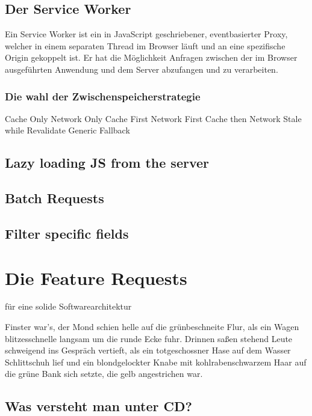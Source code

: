 \section{Der Service Worker}
Ein Service Worker ist ein in JavaScript geschriebener,
eventbasierter Proxy, welcher in einem separaten Thread im Browser
läuft und an eine spezifische Origin gekoppelt ist. Er hat
die Möglichkeit Anfragen zwischen der im Browser ausgeführten
Anwendung und dem Server abzufangen und zu verarbeiten.

\subsection{Die wahl der Zwischenspeicherstrategie}
Cache Only
Network Only
Cache First
Network First
Cache then Network
Stale while Revalidate
Generic Fallback

\section{Lazy loading JS from the server}

\section{Batch Requests}

\section{Filter specific fields}

\chapter{Die Feature Requests}

für eine solide Softwarearchitektur

Finster war's, der Mond schien helle auf die grünbeschneite Flur, als
ein Wagen blitzesschnelle langsam um die runde Ecke fuhr. Drinnen
saßen stehend Leute schweigend ins Gespräch vertieft, als ein
totgeschossner Hase auf dem Wasser Schlittschuh lief und ein
blondgelockter Knabe mit kohlrabenschwarzem Haar auf die grüne Bank
sich setzte, die gelb angestrichen war.

\section{Was versteht man unter CD?}
\label{sec:was-versteht-man-unter-cd}


